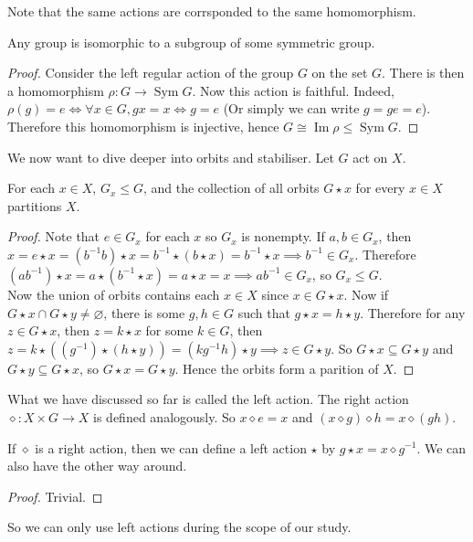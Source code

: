 Note that the same actions are corrsponded to the same homomorphism.
\begin{theorem}
    Any group is isomorphic to a subgroup of some symmetric group.
\end{theorem}
\begin{proof}
    Consider the left regular action of the group $G$ on the set $G$.
    There is then a homomorphism $\rho:G\to \operatorname{Sym}G$.
    Now this action is faithful.
    Indeed, $\rho(g)=e\iff\forall x\in G, gx=x\iff g=e$ (Or simply we can write $g=ge=e$).\\
    Therefore this homomorphism is injective, hence $G\cong\operatorname{Im}\rho\le\operatorname{Sym}G$.
\end{proof}
We now want to dive deeper into orbits and stabiliser.
Let $G$ act on $X$.
\begin{theorem}
    For each $x\in X$, $G_x\le G$, and the collection of all orbits $G\star x$ for every $x\in X$ partitions $X$.
\end{theorem}
\begin{proof}
    Note that $e\in G_x$ for each $x$ so $G_x$ is nonempty.
    If $a,b\in G_x$, then $x=e\star x=(b^{-1}b)\star x=b^{-1}\star (b\star x)=b^{-1}\star x\implies b^{-1}\in G_x$.
    Therefore $(ab^{-1})\star x=a\star(b^{-1}\star x)=a\star x=x\implies ab^{-1}\in G_x$, so $G_x\le G$.\\
    Now the union of orbits contains each $x\in X$ since $x\in G\star x$.
    Now if $G\star x\cap G\star y\neq\varnothing$, there is some $g,h\in G$ such that $g\star x=h\star y$.
    Therefore for any $z\in G\star x$, then $z=k\star x$ for some $k\in G$, then $z=k\star((g^{-1})\star(h\star y))=(kg^{-1}h)\star y\implies z\in G\star y$.
    So $G\star x\subseteq G\star y$ and $G\star y\subseteq G\star x$, so $G\star x=G\star y$.
    Hence the orbits form a parition of $X$.
\end{proof}
What we have discussed so far is called the left action.
The right action $\diamond:X\times G\to X$ is defined analogously.
So $x\diamond e=x$ and $(x\diamond g)\diamond h=x\diamond (gh)$.
\begin{proposition}
    If $\diamond$ is a right action, then we can define a left action $\star$ by $g\star x=x\diamond g^{-1}$.
    We can also have the other way around.
\end{proposition}
\begin{proof}
    Trivial.
\end{proof}
So we can only use left actions during the scope of our study.
